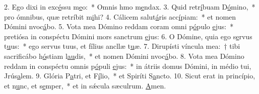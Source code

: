 2. Ego dixi in exc\uline{é}ssu m\uline{e}o:~* Omnis hmo m\uline{e}ndax.
3. Quid retr\uline{í}buam D\uline{ó}mino,~* pro ómnibus, quæ retríbit m\uline{i}hi?
4. Cálicem salut\uline{á}ris acc\uline{í}piam:~* et nomen Dómini nvoc\uline{á}bo.
5. Vota mea Dómino reddam coram omni p\uline{ó}pulo \uline{e}jus:~* pretiósa in conspéctu Dómini mors sanctrum \uline{e}jus:
6. O Dómine, quia ego s\uline{e}rvus t\uline{u}us:~* ego servus tuus, et fílius ancllæ t\uline{u}æ.
7. Dirupísti víncula mea:~† tibi sacrificábo h\uline{ó}stiam l\uline{au}dis,~* et nomen Dómini nvoc\uline{á}bo.
8. Vota mea Dómino reddam in conspéctu omnis p\uline{ó}puli \uline{e}jus:~* in átriis domus Dómini, in médio tui, Jrús\uline{a}lem.
9. Glória P\uline{a}tri, et F\uline{í}lio,~* et Spiríti S\uline{a}ncto.
10. Sicut erat in princípio, et n\uline{u}nc, et s\uline{e}mper,~* et in sǽcula sæculrum. \uline{A}men.
